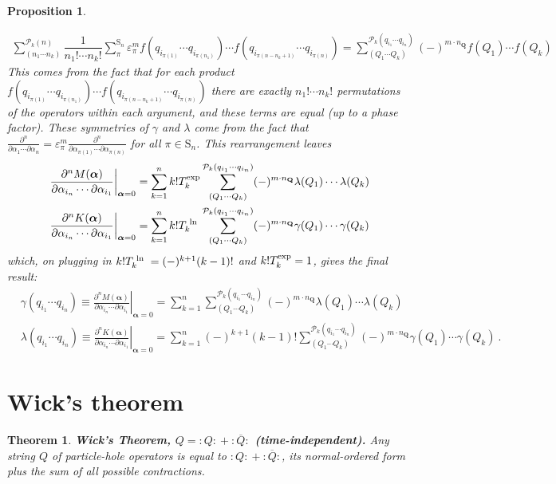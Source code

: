 \documentclass[11pt,fleqn]{article}
\renewcommand{\a}{\alpha}    %
\newcommand{\g}{\gamma}      %
\newcommand{\e}{\varepsilon} %
\newcommand{\la}{\lambda}    %
\newcommand{\ol}[1]{\ensuremath{\overline{#1}}}
\newcommand{\cd}{\ensuremath{\cdots}}
\newcommand{\bmit}[1]{{\bfseries\itshape\mathversion{bold}#1}}
\newcommand{\mc}[1]{\ensuremath{\mathcal{#1}}}
\newcommand{\mr}[1]{\ensuremath{\mathrm{#1}}}
\newcommand{\bo}[1]{\ensuremath{\mathbf{#1}}}
\newcommand{\ds}{\displaystyle}
\newcommand{\fr}[2]{\ensuremath{\dfrac{#1}{#2}}}
\newcommand{\pd}[2]{\ensuremath{\frac{\partial#1}{\partial#2}}}
\newcommand{\pt}{\ensuremath{\partial}}
\newcommand{\NO}[1]{\ensuremath{{\bm{:}}#1{}{\bm{:}}}}
\theoremstyle{mystyle}
\newtheorem{thm}{Theorem}[section]
\newtheorem{pro}{Proposition}[section]
\newcommand{\logbox}{\ensuremath{\text{\makebox[\widthof{exp}][c]{ln}}}}
\newcommand{\expbox}{\ensuremath{\text{\makebox[\widthof{exp}][c]{exp}}}}
\numberwithin{equation}{section}
\begin{document}
\begin{pro}
\begin{addmargin}[1em]{0em}
\begin{align*}
  \sum_{(n_1\cd n_k)}^{\mc{P}_k(n)}
  \fr{1}{n_1!\cd n_k!}
  \sum_{\pi}^{\mr{S}_n}
  \e_\pi^m
  f(q_{i_{\pi(1)}}\cd q_{i_{\pi(n_1)}})\cd f(q_{i_{\pi(n-n_k+1)}}\cd q_{i_{\pi(n)}})
=
  \sum_{(Q_1\cd Q_k)}^{\mc{P}_k(q_{i_1}\cd q_{i_n})}
  (-)^{m\cdot n_\bo{Q}}
  f(Q_1)\cd f(Q_k)
\end{align*}
This comes from the fact that for each product $f(q_{i_{\pi(1)}}\cd q_{i_{\pi(n_1)}})\cd f(q_{i_{\pi(n-n_k+1)}}\cd q_{i_{\pi(n)}})$ there are exactly $n_1!\cd n_k!$ permutations of the operators within each argument, and these terms are equal (up to a phase factor).
These symmetries of $\g$ and $\la$ come from the fact that $\ds\pd{^n}{\a_1\cd \pt\a_n}=\e_\pi^m\pd{^n}{\a_{\pi(1)}\cd \pt\a_{\pi(n)}}$ for all $\pi\in\mr{S}_n$.
This rearrangement leaves
\begin{align*}
&
  \left.
  \pd{^n M(\bm\a)}{\a_{i_n}\cd\pt\a_{i_1}}
  \right|_{\bm\a=0}
=
  \sum_{k=1}^n
  k! T_k^{\expbox}
  \sum_{(Q_1\cd Q_k)}^{\mc{P}_k(q_{i_1}\cd q_{i_n})}
  (-)^{m\cdot n_\bo{Q}}
  \la(Q_1)\cd \la(Q_k)
\\
&
  \left.
  \pd{^n K(\bm\a)}{\a_{i_n}\cd\pt\a_{i_1}}
  \right|_{\bm\a=0}
=
  \sum_{k=1}^n
  k! T_k^{\logbox}
  \sum_{(Q_1\cd Q_k)}^{\mc{P}_k(q_{i_1}\cd q_{i_n})}
  (-)^{m\cdot n_\bo{Q}}
  \g(Q_1)\cd \g(Q_k)
\end{align*}
which, on plugging in $k!T_k^{\logbox}=(-)^{k+1}(k-1)!$ and $k!T_k^{\expbox}=1$, gives the final result:
\begin{align*}
&
  \g(q_{i_1}\cd q_{i_n})
\equiv
  \left.
  \pd{^n M(\bm\a)}{\a_{i_n}\cd\pt\a_{i_1}}
  \right|_{\bm\a=0}
=
  \sum_{k=1}^n
  \sum_{(Q_1\cd Q_k)}^{\mc{P}_k(q_{i_1}\cd q_{i_n})}
  (-)^{m\cdot n_\bo{Q}}
  \la(Q_1)\cd \la(Q_k)
\\
&
  \la(q_{i_1}\cd q_{i_n})
\equiv
  \left.
  \pd{^n K(\bm\a)}{\a_{i_n}\cd\pt\a_{i_1}}
  \right|_{\bm\a=0}
=
  \sum_{k=1}^n
  (-)^{k+1}(k-1)!
  \sum_{(Q_1\cd Q_k)}^{\mc{P}_k(q_{i_1}\cd q_{i_n})}
  (-)^{m\cdot n_\bo{Q}}
  \g(Q_1)\cd \g(Q_k)\ .
\end{align*}
\end{addmargin}
\end{pro}



\section{Wick's theorem}


\begin{thm}
\label{wick-thm}
\bmit{Wick's Theorem, $Q=\NO{Q}+\NO{\ol{Q}}$ (time-independent).}
\textit{Any string $Q$ of particle-hole operators is equal to $\NO{Q}+\NO{\ol{Q}}$, its normal-ordered form plus the sum of all possible contractions.}
\end{thm}
\end{document}
